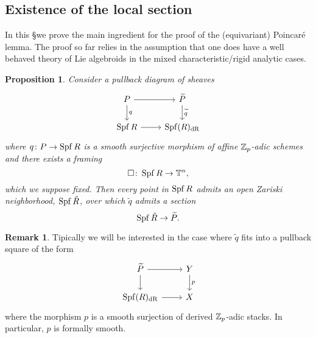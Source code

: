 \documentclass[10pt,a4paper]{amsart}
\numberwithin{equation}{subsection}
\newtheorem{proposition}[theorem]{Proposition}
\theoremstyle{definition}
\newtheorem{remark}[theorem]{Remark}
\begin{document}
\subsection{Existence of the local section}

In this \S we prove the main ingredient for the proof of the (equivariant) Poincaré lemma. The proof so far relies in the assumption that one does have a well behaved theory
of Lie algebroids in the mixed characteristic/rigid analytic cases.

\begin{proposition}
    Consider a pullback diagram of sheaves
        \[
        \begin{tikzcd}
           P \ar{r} \ar{d}{q} & \tP \ar{d}{\widetilde{q}} \\
            \Spf R \ar{r} & \Spf(R)_\dR  
        \end{tikzcd}
        \]
    where $q \colon P \to \operatorname{Spf} R$ is a smooth surjective morphism of affine $\mathbb Z_p$-adic schemes and there exists a framing
        \[
            \square \colon \operatorname{Spf} R \to \mathbb T^n  ,
        \]
    which we suppose fixed. Then every point in $\operatorname{Spf} R$ admits an open Zariski neighborhood, $\operatorname{Spf} \tilde{R}$, over which $\widetilde{q}$ admits a section
        \[
            \operatorname{Spf} \tilde{R} \to \widetilde{P}.
        \]
\end{proposition}

\begin{remark} \label{rem:formal_smoothness_of_q_tilde}
    Tipically we will be interested in the case where $\tilde{q}$ fits into a pullback square of the form
        \[
        \begin{tikzcd}
            \tP \ar{r} \ar{d} & Y \ar{d}{p} \\
            \Spf (R)_\dR \ar{r} & X  
        \end{tikzcd}
        \]
    where the morphism $p$ is a smooth surjection of derived $\mathbb Z_p$-adic stacks. In particular, $p$ is formally smooth.
\end{remark}
\end{document}
